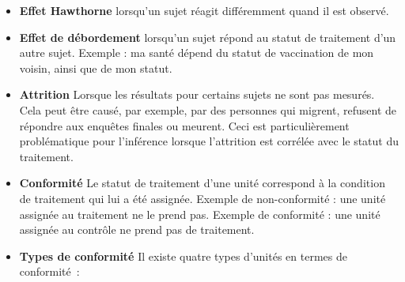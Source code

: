\documentclass[12pt,]{book}
\begin{document}
\begin{itemize}
\item
  \textbf{Effet Hawthorne} lorsqu'un sujet réagit différemment quand il est observé.
\item
  \textbf{Effet de débordement} lorsqu'un sujet répond au statut de traitement d'un autre sujet.
  Exemple : ma santé dépend du statut de vaccination de mon voisin, ainsi que de mon statut.
\item
  \textbf{Attrition} Lorsque les résultats pour certains sujets ne sont pas mesurés.
  Cela peut être causé, par exemple, par des personnes qui migrent, refusent de répondre aux enquêtes finales ou meurent.
  Ceci est particulièrement problématique pour l'inférence lorsque l'attrition est corrélée avec le statut du traitement.
\item
  \textbf{Conformité} Le statut de traitement d'une unité correspond à la condition de traitement qui lui a été assignée.
  Exemple de non-conformité : une unité assignée au traitement ne le prend pas.
  Exemple de conformité : une unité assignée au contrôle ne prend pas de traitement.
\item
  \textbf{Types de conformité} Il existe quatre types d'unités en termes de conformité~:


\end{itemize}
\end{document}
